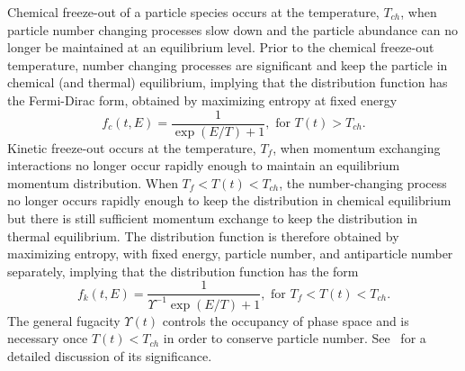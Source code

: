 \documentclass[universe,article,submit,moreauthors,pdftex,a4paper]{Definitions/mdpi}
\begin{document}
Chemical freeze-out of a particle species occurs at the temperature, 
$T_{ch}$, when particle number changing processes slow down and the particle abundance can no longer be maintained at an equilibrium level. Prior to the chemical freeze-out temperature, number changing processes are significant and keep the particle in chemical (and thermal) equilibrium, implying that the distribution function has the Fermi-Dirac form, obtained by maximizing entropy at fixed energy
\begin{equation}\label{equilibrium}
f_{c}(t,E)=\frac{1}{\exp(E/T)+1}, \text{ for } T(t)> T_{ch}.
\end{equation}
Kinetic freeze-out occurs at the temperature, $T_f$, when momentum exchanging interactions no longer occur rapidly enough to maintain an equilibrium momentum distribution. When $T_f<T(t)<T_{ch}$, the number-changing process no longer occurs rapidly enough to keep the distribution in chemical equilibrium but there is still sufficient momentum exchange to keep the distribution in thermal equilibrium. The distribution function is therefore obtained by maximizing entropy, with fixed energy, particle number, and antiparticle number separately, implying that the distribution function has the form
\begin{equation}\label{kinetic_equilib}
f_k(t,E)=\frac{1}{\Upsilon^{-1}\exp(E/T)+1}, \text{ for }T_f< T(t)< T_{ch}.
\end{equation}
The general fugacity $\Upsilon(t)$
controls the occupancy of phase space and is necessary once $T(t)<T_{ch}$ in order to conserve particle number. See~\cite{Birrell:2012gg} for a detailed discussion of its significance.
 
\end{document}

